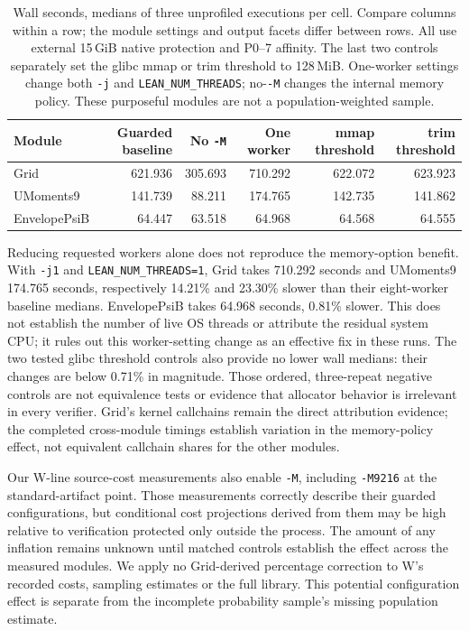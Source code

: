 \documentclass[10pt,twocolumn]{article}
\begin{document}
\begin{table}[t]
\centering\small
\begin{tabular}{lrrrrr}
\toprule
Module & Guarded baseline & No \texttt{-M} & One worker & mmap threshold & trim threshold\\
\midrule
Grid & 621.936 & 305.693 & 710.292 & 622.072 & 623.923\\
UMoments9 & 141.739 & 88.211 & 174.765 & 142.735 & 141.862\\
EnvelopePsiB & 64.447 & 63.518 & 64.968 & 64.568 & 64.555\\
\bottomrule
\end{tabular}
\caption{Wall seconds, medians of three unprofiled executions per cell.
Compare columns within a row; the module settings and output facets differ
between rows. All use external 15\,GiB native protection and P0--7 affinity.
The last two controls separately set the glibc mmap or trim threshold
to 128\,MiB. One-worker settings change both \texttt{-j} and
\texttt{LEAN\_NUM\_THREADS}; no-\texttt{-M} changes the internal memory policy.
These purposeful modules are not a population-weighted sample.}
\label{tab:memory-policy-matrix}
\end{table}

Reducing requested workers alone does not reproduce the memory-option
benefit. With \texttt{-j1} and \texttt{LEAN\_NUM\_THREADS=1}, Grid takes
710.292 seconds and UMoments9 174.765 seconds, respectively 14.21\%
and 23.30\% slower than their eight-worker baseline medians.
EnvelopePsiB takes 64.968 seconds, 0.81\% slower.
This does not establish the number of live OS threads or attribute the
residual system CPU; it rules out this worker-setting change as an
effective fix in these runs.
The two tested glibc threshold controls also provide no lower wall medians:
their changes are below 0.71\% in magnitude.
Those ordered, three-repeat negative controls are not equivalence tests or
evidence that allocator behavior is irrelevant in every verifier.
Grid's kernel callchains remain the direct attribution evidence;
the completed cross-module timings establish variation in the memory-policy
effect, not equivalent callchain shares for the other modules.

Our W-line source-cost measurements also enable \texttt{-M}, including
\texttt{-M9216} at the standard-artifact point.
Those measurements correctly describe their guarded configurations, but
conditional cost projections derived from them may be high relative to
verification protected only outside the process.
The amount of any inflation remains unknown until matched controls
establish the effect across the measured modules.
We apply no Grid-derived percentage correction to W's recorded costs,
sampling estimates or the full library.
This potential configuration effect is separate from the incomplete
probability sample's missing population estimate.
\end{document}
